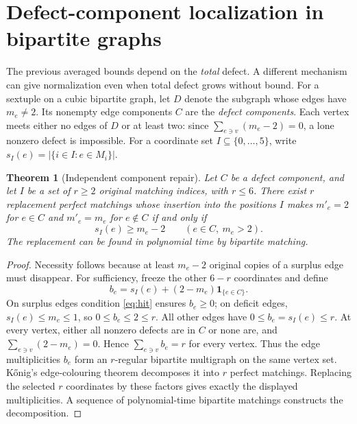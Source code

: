 \documentclass[11pt]{article}
\newtheorem{theorem}{Theorem}
\begin{document}
\section{Defect-component localization in bipartite graphs}
The previous averaged bounds depend on the \emph{total} defect. A different
mechanism can give normalization even when total defect grows without bound.
For a sextuple on a cubic bipartite graph, let $D$ denote the subgraph whose
edges have $m_e\ne2$. Its nonempty edge components $C$ are the
\emph{defect components}. Each vertex meets either no edges of $D$ or at
least two: since $\sum_{e\ni v}(m_e-2)=0$, a lone nonzero defect is impossible.
For a coordinate set $I\subseteq\{0,\ldots,5\}$, write
$s_I(e)=|\{i\in I:e\in M_i\}|$.

\begin{theorem}[Independent component repair]\label{thm:component}
Let $C$ be a defect component, and let $I$ be a set of $r\ge2$ original
matching indices, with $r\le6$. There exist $r$ replacement perfect matchings
whose insertion into the positions $I$ makes $m'_e=2$ for $e\in C$ and
$m'_e=m_e$ for $e\notin C$ \emph{if and only if}
\begin{equation}\label{eq:hit}
s_I(e)\ge m_e-2\qquad(e\in C,\ m_e>2).
\end{equation}
The replacement can be found in polynomial time by bipartite matching.
\end{theorem}
\begin{proof}
Necessity follows because at least $m_e-2$ original copies of a surplus edge
must disappear. For sufficiency, freeze the other $6-r$ coordinates and define
\[
b_e=s_I(e)+(2-m_e)\mathbf1_{\{e\in C\}}.
\]
On surplus edges condition \eqref{eq:hit} ensures $b_e\ge0$; on deficit
edges, $s_I(e)\le m_e\le1$, so $0\le b_e\le2\le r$. All other edges have
$0\le b_e=s_I(e)\le r$. At every vertex, either all nonzero defects are in
$C$ or none are, and $\sum_{e\ni v}(2-m_e)=0$. Hence
$\sum_{e\ni v}b_e=r$ for every vertex. Thus the edge multiplicities $b_e$
form an $r$-regular bipartite multigraph on the same vertex set.
K\H{o}nig's edge-colouring theorem decomposes it into $r$ perfect matchings.
Replacing the selected $r$ coordinates by these factors gives exactly the
displayed multiplicities. A sequence of polynomial-time bipartite matchings
constructs the decomposition.
\end{proof}
\end{document}
